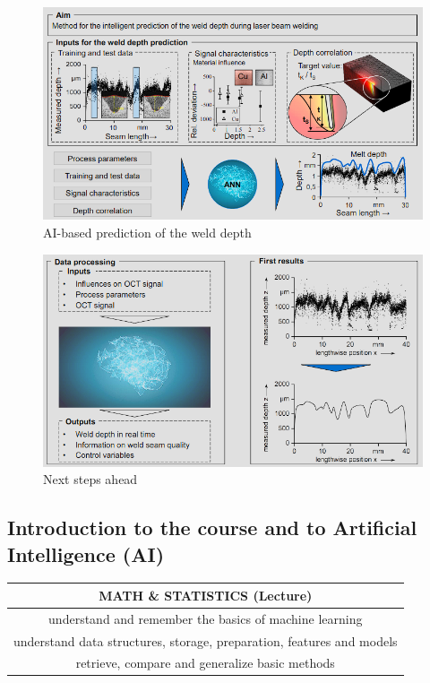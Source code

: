 \documentclass[12pt, a4paper, oneside, justified]{article}
\begin{document}
\begin{figure}[htbp]
    \centering
    \includegraphics[scale=1]{../img/1-8.png}
    \caption{AI-based prediction of the weld depth}
    \label{img/1-8}
\end{figure}
\begin{figure}[htbp]
    \centering
    \includegraphics[scale=1]{../img/1-9.png}
    \caption{Next steps ahead}
    \label{img/}
\end{figure}

\vspace{3cm}
\subsection{Introduction to the course and to Artificial Intelligence (AI)}

\begin{table}[!h]
\centering
\begin{tabular}{c}
    MATH \& STATISTICS (Lecture) \\
    \hline
    understand and remember the basics of machine learning \\
    understand data structures, storage, preparation, features and models \\
    retrieve, compare and generalize basic methods \\
\end{tabular}
\end{table}
\end{document}
